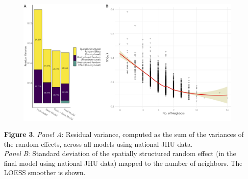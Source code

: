 \documentclass[aspectratio=169]{beamer}
\begin{document}
 \begin{frame}
\vspace*{-0.1cm}
			\begin{figure}
				\centering
				\includegraphics[scale=0.082]{images-logos/combo-res-var-nbs-jhu.png}
				
			\end{figure}      
			\vspace{-0.17cm}
			\tiny{\textbf{Figure 3}. \textit{Panel A}: Residual variance, computed as the sum of the variances of the random effects, across all models using national JHU data.\\  \textit{Panel B}: Standard deviation of the spatially structured random effect (in the final model using national JHU data) mapped to the number of neighbors. The LOESS smoother is shown.}



\end{frame}


\end{document}
